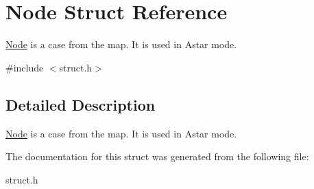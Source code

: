 \hypertarget{struct_node}{}\section{Node Struct Reference}
\label{struct_node}


\hyperlink{struct_node}{Node} is a case from the map. It is used in Astar mode.  




{\ttfamily \#include $<$struct.\+h$>$}



\subsection{Detailed Description}
\hyperlink{struct_node}{Node} is a case from the map. It is used in Astar mode. 

The documentation for this struct was generated from the following file\+:\begin{DoxyCompactItemize}
\item 
struct.\+h\end{DoxyCompactItemize}

